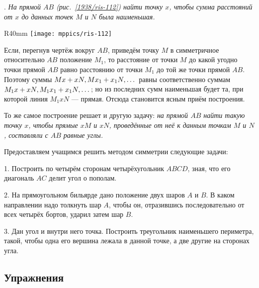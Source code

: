 \smallskip
{}.
\emph{На прямой $AB$ \emph{(рис.~\ref{1938/ris-112})} найти точку $x$, чтобы сумма расстояний от $x$ до данных точек $M$ и $N$ была наименьшая.}

\begin{wrapfigure}{R}{40mm}
\centering
\texttt{[image: mppics/ris-112]}
\caption{}\label{1938/ris-112}
\end{wrapfigure}

Если, перегнув чертёж вокруг $AB$, приведём точку $M$ в симметричное относительно $AB$ положение $M_1$, то расстояние от точки $M$ до какой угодно точки прямой $AB$ равно расстоянию от точки $M_1$ до той же точки прямой $AB$.
Поэтому суммы $Mx+xN,  Mx_1\z+x_1N,\dots $ равны соответственно суммам $M_1x+xN, M_1x_1\z+x_1N, \dots$;
но из последних сумм наименьшая будет та, при которой линия $M_1xN$ — прямая.
Отсюда становится ясным приём построения.

То же самое построение решает и другую задачу:
\emph{на прямой $AB$ найти такую точку $x$, чтобы прямые $xM$ и $xN$, проведённые от неё к данным точкам $M$ и $N$, составляли с $AB$ равные углы.}

Предоставляем учащимся решить методом симметрии следующие задачи:

\medskip

1.
Построить по четырём сторонам четырёхугольник $ABCD$, зная, что его диагональ $AC$ делит угол о пополам.

2.
На прямоугольном бильярде дано положение двух шаров $A$ и $B$.
В каком направлении надо толкнуть шар $A$, чтобы он, отразившись последовательно от всех четырёх бортов, ударил затем шар $B$.

3.
Дан угол и внутри него точка.
Построить треугольник наименьшего периметра, такой, чтобы одна его вершина лежала в данной точке, а две другие на сторонах угла.

\subsection*{Упражнения}


\begin{center}
\end{center}

